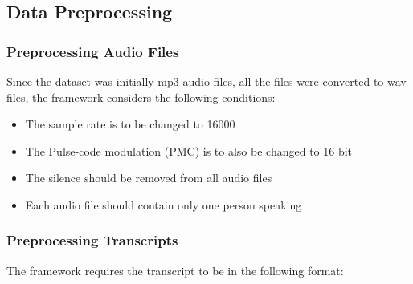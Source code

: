 \documentclass[
  a4paper,
]{article}
\providecommand{\tightlist}{%
  \setlength{\itemsep}{0pt}\setlength{\parskip}{0pt}}
\begin{document}
\hypertarget{data-preprocessing}{%
\subsection{Data Preprocessing}\label{data-preprocessing}}

\hypertarget{preprocessing-audio-files}{%
\subsubsection{Preprocessing Audio
Files}\label{preprocessing-audio-files}}

Since the dataset was initially mp3 audio files, all the files were
converted to wav files, the framework considers the following
conditions:

\begin{itemize}
\tightlist
\item
  The sample rate is to be changed to 16000
\item
  The Pulse-code modulation (PMC) is to also be changed to 16 bit
\item
  The silence should be removed from all audio files
\item
  Each audio file should contain only one person speaking
\end{itemize}

\hypertarget{preprocessing-transcripts}{%
\subsubsection{Preprocessing
Transcripts}\label{preprocessing-transcripts}}

The framework requires the transcript to be in the following format:
\end{document}
